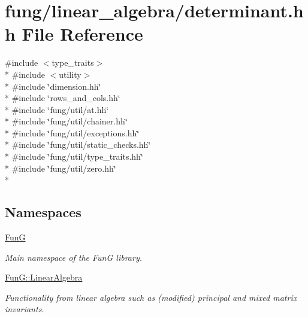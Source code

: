 \hypertarget{determinant_8hh}{}\section{fung/linear\+\_\+algebra/determinant.hh File Reference}
\label{determinant_8hh}
{\ttfamily \#include $<$type\+\_\+traits$>$}\\*
{\ttfamily \#include $<$utility$>$}\\*
{\ttfamily \#include \char`\"{}dimension.\+hh\char`\"{}}\\*
{\ttfamily \#include \char`\"{}rows\+\_\+and\+\_\+cols.\+hh\char`\"{}}\\*
{\ttfamily \#include \char`\"{}fung/util/at.\+hh\char`\"{}}\\*
{\ttfamily \#include \char`\"{}fung/util/chainer.\+hh\char`\"{}}\\*
{\ttfamily \#include \char`\"{}fung/util/exceptions.\+hh\char`\"{}}\\*
{\ttfamily \#include \char`\"{}fung/util/static\+\_\+checks.\+hh\char`\"{}}\\*
{\ttfamily \#include \char`\"{}fung/util/type\+\_\+traits.\+hh\char`\"{}}\\*
{\ttfamily \#include \char`\"{}fung/util/zero.\+hh\char`\"{}}\\*
\subsection*{Namespaces}
\begin{DoxyCompactItemize}
\item 
 \hyperlink{namespaceFunG}{Fun\+G}
\begin{DoxyCompactList}\small\item\em Main namespace of the Fun\+G library. \end{DoxyCompactList}\item 
 \hyperlink{namespaceFunG_1_1LinearAlgebra}{Fun\+G\+::\+Linear\+Algebra}
\begin{DoxyCompactList}\small\item\em Functionality from linear algebra such as (modified) principal and mixed matrix invariants. \end{DoxyCompactList}\end{DoxyCompactItemize}
